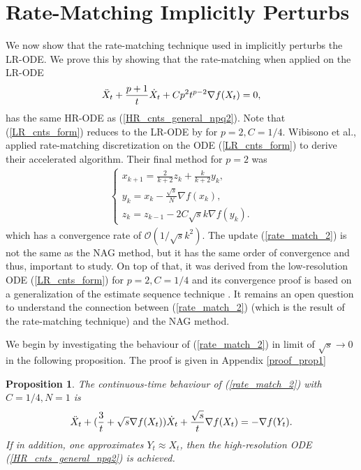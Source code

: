 \documentclass{article}
\theoremstyle{plain}
\newtheorem{proposition}[theorem]{Proposition}
\theoremstyle{definition}
\theoremstyle{remark}
\begin{document}
\section{Rate-Matching Implicitly Perturbs}\label{section4}
We now show that the rate-matching technique used in \citep{WibisonoE7351} implicitly perturbs the LR-ODE. We prove this by showing that the rate-matching when applied on the LR-ODE 
\begin{align}\label{LR_cnts_form}
        \Ddot{X}_t+ \frac{p+1}{t}\dot{X}_t+Cp^2t^{p-2}\nabla f(X_t)=0,
\end{align}
has the same HR-ODE as (\ref{HR_cnts_general_npq2}). Note that (\ref{LR_cnts_form}) reduces to the LR-ODE by \citep{JMLR:v17:15-084} for \(p=2,C=1/4\).
 Wibisono et al., applied rate-matching discretization on the ODE (\ref{LR_cnts_form}) to derive their accelerated algorithm. Their final method for \(p=2\) was 
\begin{align}\label{rate_match_2}
    \left\{\begin{array}{l}
    x_{k+1}=\frac{2}{k+2}z_k+\frac{k}{k+2}y_k,\\
    y_{k}=x_k-\frac{\sqrt{s}}{N}\nabla f(x_k),   \\
    z_{k}=z_{k-1} -2C\sqrt{s} k\nabla f(y_k)  .    
    \end{array}\right.
\end{align}
which has a convergence rate of \(\mathcal{O}(1/\sqrt{s} k^2)\). The update (\ref{rate_match_2}) is not the same as the NAG method, but it has the same order of convergence and thus, important to study. On top of that, it was derived from the low-resolution ODE (\ref{LR_cnts_form}) for \(p=2,C=1/4\) and its convergence proof is based on a generalization of the estimate sequence technique \citep{baes2009estimate}. It remains an open question to understand the connection between (\ref{rate_match_2}) (which is the result of the rate-matching technique) and the NAG method. \par
 We begin by investigating the behaviour of (\ref{rate_match_2}) in limit of \(\sqrt{s} \rightarrow 0\) in the following proposition. The proof is given in Appendix \ref{proof_prop1}
\begin{proposition}\label{prop1}
The continuous-time behaviour of (\ref{rate_match_2}) with \(C=1/4,N=1\) is
\begin{align}\label{cont_rate_match_2}
    \Ddot{X}_t+(\frac{3}{t}+\sqrt{s}\nabla f(X_t))\dot X_t+\frac{\sqrt{s}}{t}\nabla f(X_t)=-\nabla f(Y_t).
\end{align}
If in addition, one approximates \(Y_t\approx X_t\), then the high-resolution ODE (\ref{HR_cnts_general_npq2}) is achieved.
\end{proposition}
\end{document}
